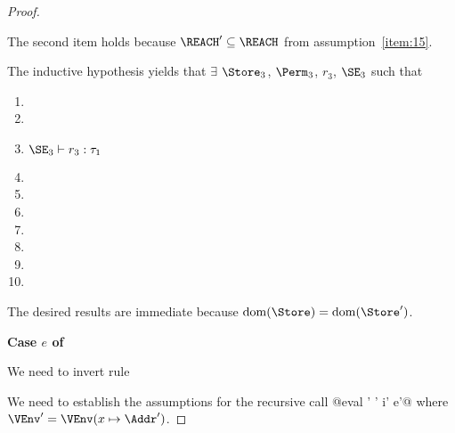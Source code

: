 \begin{proof}
\begin{enumerate}[({A1-}1)]
    The second item holds because $\REACH' \subseteq \REACH$ from
    assumption~\ref{item:15}.
  \end{enumerate}
  The inductive hypothesis yields that
    $\exists$ $\Store_3$, $\Perm_3$, $r_3$, $\SE_3$ such that
  \begin{enumerate}[({R1-}1)]
  \item {}
  \item {}
  \item $\SE_3 \vdash r_3 : \tau_1$
  \item {}
  \item {}
  \item {}
  \item {}
  \item {}
  \item {}
  \item {}
  \end{enumerate}
  The desired results are immediate because $\Dom\Store = \Dom{\Store'}$.

  \newpage{}
  \textbf{Case $e$ of}

  We need to invert rule 
  \begin{mathpar}
  \end{mathpar}

  We need to establish the assumptions for the recursive call
  @eval \Store \Perm' \VEnv' i' e'@ where  $\VEnv' =
  \VEnv (x\mapsto \Addr')$.


\end{proof}
